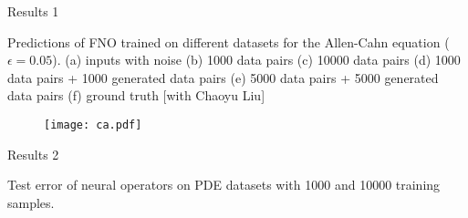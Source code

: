 \documentclass{beamer}
\begin{document}
\begin{frame}{Results 1}

Predictions of FNO trained on different datasets for the Allen-Cahn equation ($\epsilon = 0.05$). (a) inputs with noise (b) 1000 data pairs (c) 10000 data pairs (d) 1000 data pairs + 1000 generated data pairs (e) 5000 data pairs + 5000 generated data pairs (f) ground truth {\color{blue} [with Chaoyu Liu]}
    \begin{figure}
    \centering
     \texttt{[image: ca.pdf]}
    \end{figure}
\end{frame}

\begin{frame}{Results 2}


{\color{blue} Test error of neural operators on PDE datasets with 1000 and 10000 training samples.}
\begin{table}[htbp]
\centering
\vskip 0.15in
\label{table:results-combined}
\end{table}
\end{frame}
\end{document}
